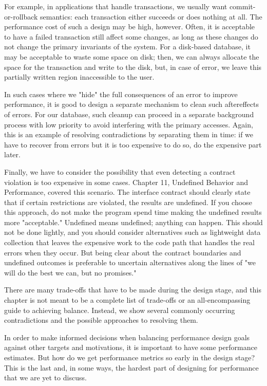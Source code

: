 For example, in applications that handle transactions, we usually want commit-or-rollback semantics: each transaction either succeeds or does nothing at all. The performance cost of such a design may be high, however. Often, it is acceptable to have a failed transaction still affect some changes, as long as these changes do not change the primary invariants of the system. For a disk-based database, it may be acceptable to waste some space on disk; then, we can always allocate the space for the transaction and write to the disk, but, in case of error, we leave this partially written region inaccessible to the user.

In such cases where we "hide" the full consequences of an error to improve performance, it is good to design a separate mechanism to clean such aftereffects of errors. For our database, such cleanup can proceed in a separate background process with low priority to avoid interfering with the primary accesses. Again, this is an example of resolving contradictions by separating them in time: if we have to recover from errors but it is too expensive to do so, do the expensive part later.

Finally, we have to consider the possibility that even detecting a contract violation is too expensive in some cases. Chapter 11, Undefined Behavior and Performance, covered this scenario. The interface contract should clearly state that if certain restrictions are violated, the results are undefined. If you choose this approach, do not make the program spend time making the undefined results more "acceptable." Undefined means undefined; anything can happen. This should not be done lightly, and you should consider alternatives such as lightweight data collection that leaves the expensive work to the code path that handles the real errors when they occur. But being clear about the contract boundaries and undefined outcomes is preferable to uncertain alternatives along the lines of "we will do the best we can, but no promises." 

There are many trade-offs that have to be made during the design stage, and this chapter is not meant to be a complete list of trade-offs or an all-encompassing guide to achieving balance. Instead, we show several commonly occurring contradictions and the possible approaches to resolving them. 

In order to make informed decisions when balancing performance design goals against other targets and motivations, it is important to have some performance estimates. But how do we get performance metrics so early in the design stage? This is the last and, in some ways, the hardest part of designing for performance that we are yet to discuss.














